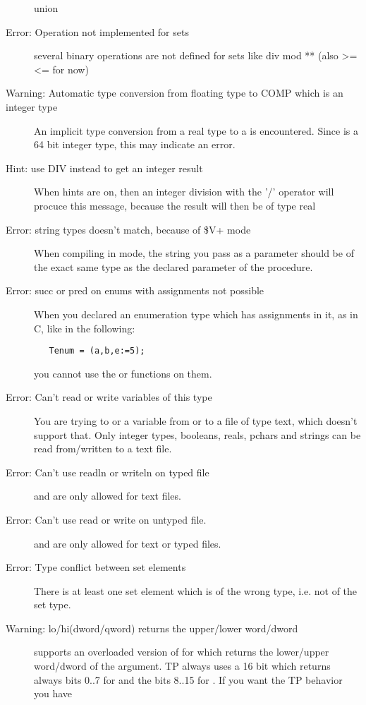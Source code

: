 \begin{description}
 union
\item [Error: Operation not implemented for sets]
 several binary operations are not defined for sets
 like div mod ** (also >= <= for now)
\item [Warning: Automatic type conversion from floating type to COMP which is an integer type]
 An implicit type conversion from a real type to a  is
 encountered. Since  is a 64 bit integer type, this may indicate
 an error.
\item [Hint: use DIV instead to get an integer result]
 When hints are on, then an integer division with the '/' operator will
 procuce this message, because the result will then be of type real
\item [Error: string types doesn't match, because of \$V+ mode]
 When compiling in  mode, the string you pass as a parameter
 should be of the exact same type as the declared parameter of the procedure.
\item [Error: succ or pred on enums with assignments not possible]
 When you declared an enumeration type which has assignments in it, as in C,
 like in the following:
 \begin{verbatim}
   Tenum = (a,b,e:=5);
 \end{verbatim}
 you cannot use the  or  functions on them.
\item [Error: Can't read or write variables of this type]
 You are trying to  or  a variable from or to a
 file of type text, which doesn't support that. Only integer types,
 booleans, reals, pchars and strings can be read from/written to a text file.
\item [Error: Can't use readln or writeln on typed file]
  and  are only allowed for text files.
\item [Error: Can't use read or write on untyped file.]
  and  are only allowed for text or typed files.
\item [Error: Type conflict between set elements]
 There is at least one set element which is of the wrong type, i.e. not of
 the set type.
\item [Warning: lo/hi(dword/qword) returns the upper/lower word/dword]
 \fpc supports an overloaded version of  for 
 which returns the lower/upper word/dword of the argument. TP always uses
 a 16 bit  which returns always bits 0..7 for  and the
 bits 8..15 for . If you want the TP behavior you have

\end{description}
